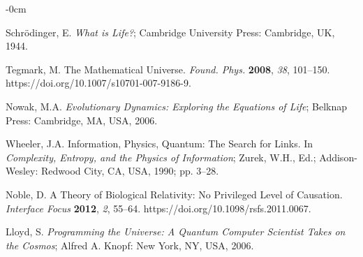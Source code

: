 \documentclass[entropy,article,submit,pdftex,moreauthors]{Definitions/mdpi}
\begin{document}


\acknowledgments{}


\begin{adjustwidth}{-\extralength}{0cm}



%

\begin{thebibliography}{999}
Schrödinger, E. \textit{What is Life?}; Cambridge University Press: Cambridge, UK, 1944.

Tegmark, M. The Mathematical Universe. \textit{Found. Phys.} \textbf{2008}, \textit{38}, 101–150. https://doi.org/10.1007/s10701-007-9186-9.

Nowak, M.A. \textit{Evolutionary Dynamics: Exploring the Equations of Life}; Belknap Press: Cambridge, MA, USA, 2006.

Wheeler, J.A. Information, Physics, Quantum: The Search for Links. In \textit{Complexity, Entropy, and the Physics of Information}; Zurek, W.H., Ed.; Addison-Wesley: Redwood City, CA, USA, 1990; pp. 3–28.

Noble, D. A Theory of Biological Relativity: No Privileged Level of Causation. \textit{Interface Focus} \textbf{2012}, \textit{2}, 55–64. https://doi.org/10.1098/rsfs.2011.0067.

Lloyd, S. \textit{Programming the Universe: A Quantum Computer Scientist Takes on the Cosmos}; Alfred A. Knopf: New York, NY, USA, 2006.


\end{thebibliography}
\end{adjustwidth}
\end{document}

